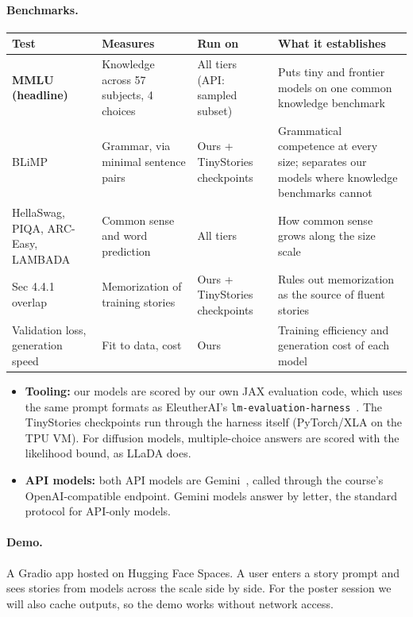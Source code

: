 \documentclass[11pt]{article}
\begin{document}
\paragraph{Benchmarks.}

\begin{center}
\small
\begin{tabularx}{\linewidth}{>{\raggedright\arraybackslash}p{2.8cm} Y >{\raggedright\arraybackslash}p{2.6cm} Y}
\toprule
\textbf{Test} & \textbf{Measures} & \textbf{Run on} & \textbf{What it establishes} \\
\midrule
\textbf{MMLU (headline)} & Knowledge across 57 subjects, 4 choices & All tiers (API: sampled subset) & Puts tiny and frontier models on one common knowledge benchmark \\
BLiMP~\cite{blimp} & Grammar, via minimal sentence pairs & Ours + TinyStories checkpoints & Grammatical competence at every size; separates our models where knowledge benchmarks cannot \\
HellaSwag, PIQA, ARC-Easy, LAMBADA & Common sense and word prediction & All tiers & How common sense grows along the size scale \\
Sec 4.4.1 overlap & Memorization of training stories & Ours + TinyStories checkpoints & Rules out memorization as the source of fluent stories \\
Validation loss, generation speed & Fit to data, cost & Ours & Training efficiency and generation cost of each model \\
\bottomrule
\end{tabularx}
\end{center}

\begin{itemize}
  \item \textbf{Tooling:} our models are scored by our own JAX evaluation code, which uses the same prompt formats as EleutherAI's \texttt{lm-evaluation-harness}~\cite{harness}. The TinyStories checkpoints run through the harness itself (PyTorch/XLA on the TPU VM). For diffusion models, multiple-choice answers are scored with the likelihood bound, as LLaDA does.
  \item \textbf{API models:} both API models are Gemini~\cite{gemini}, called through the course's OpenAI-compatible endpoint. Gemini models answer by letter, the standard protocol for API-only models.
\end{itemize}

\paragraph{Demo.} A Gradio app hosted on Hugging Face Spaces. A user enters a story prompt and sees stories from models across the scale side by side. For the poster session we will also cache outputs, so the demo works without network access.
\end{document}
